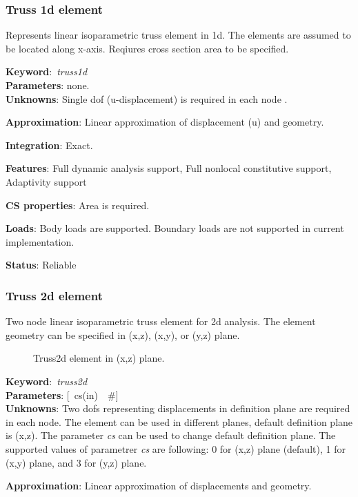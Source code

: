 \documentclass[12pt,dvips]{article}
\newcommand{\descitem}[1]{{\noindent \bf #1}:}
\newcommand{\elemkeyword}[1]{\descitem{Keyword}~{\em #1}}
\newcommand{\elemparam}[2]{{{#1\tiny (#2)}~~\#}}
\newcommand{\optelemparam}[2]{{[~\elemparam{#1}{#2}]}}
\newcommand{\param}[1]{{\it #1}}
\begin{document}
\subsubsection{Truss 1d element}
\label{Truss1d}

Represents linear isoparametric truss element in 1d. The elements are
assumed to be located along x-axis. Reqiures cross section area to be
specified.

\elemkeyword{truss1d}\\
\descitem{Parameters} none.\\
\descitem{Unknowns}
Single dof (u-displacement) is required in each node .

\descitem{Approximation} Linear approximation of displacement (u) and geometry.

\descitem{Integration} Exact.

\descitem{Features} Full dynamic analysis support, Full nonlocal
constitutive support, Adaptivity support

\descitem{CS properties} Area is required.

\descitem{Loads} Body loads are supported. Boundary loads are
not supported in current implementation.

\descitem{Status} Reliable

\subsubsection{Truss 2d element}
\label{Truss2d}

Two node linear isoparametric truss element for 2d analysis. The
element geometry can be specified in (x,z), (x,y), or (y,z) plane. 
\begin{figure}[tb]
\centerline{}
\caption{Truss2d element in (x,z) plane.}
\end{figure}

\elemkeyword{truss2d}\\
\descitem{Parameters} \optelemparam{cs}{in}\\

\descitem{Unknowns}
Two dofs representing displacements in definition plane are required
in each node. The element can be used in different planes, default
definition plane is (x,z). The parameter \param{cs} can be used to
change default definition plane. The supported values of parametrer
\param{cs} are following: 0 for (x,z) plane (default), 1 for (x,y)
plane, and 3 for (y,z) plane.

\descitem{Approximation} Linear approximation of displacements and geometry.
\end{document}

